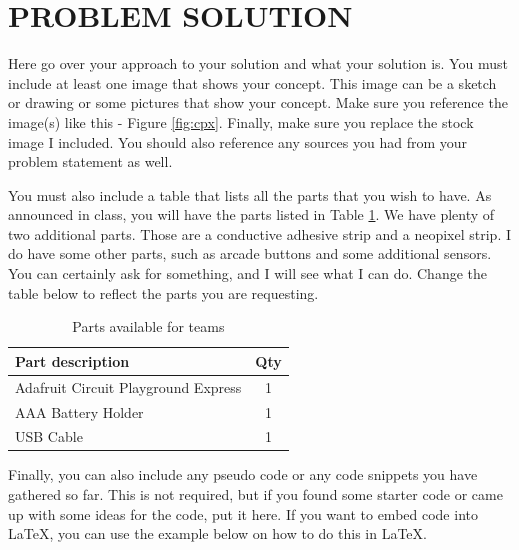 \documentclass[12pt]{article}
\begin{document}
\section{PROBLEM SOLUTION}
Here go over your approach to your solution and what your solution is. You must include at least one image that shows your concept. This image can be a sketch or drawing or some pictures that show your concept. Make sure you reference the image(s) like this - Figure \ref{fig:cpx}. Finally, make sure you replace the stock image I included. You should also reference any sources you had from your problem statement as well.

You must also include a table that lists all the parts that you wish to have. As announced in class, you will have the parts listed in Table \ref{table:parts_list}. We have plenty of two additional parts. Those are a conductive adhesive strip and a neopixel strip. I do have some other parts, such as arcade buttons and some additional sensors. You can certainly ask for something, and I will see what I can do. Change the table below to reflect the parts you are requesting.

\begin{table}[ht]
  \caption{Parts available for teams}
  \label{table:parts_list}
  \begin{center}
  \begin{tabular}{|p{3in}|c|}
  
  \hline
  Part description & Qty\\
  \hline
  \hline
  Adafruit Circuit Playground Express & 1 \\
  \hline
  AAA Battery Holder & 1 \\
  \hline
  USB Cable & 1 \\
  \hline
  \end{tabular}
  \end{center}
  \end{table}

Finally, you can also include any pseudo code or any code snippets you have gathered so far.  This is not required, but if you found some starter code or came up with some ideas for the code, put it here. If you want to embed code into \LaTeX, you can use the example below on how to do this in \LaTeX.
\end{document}
